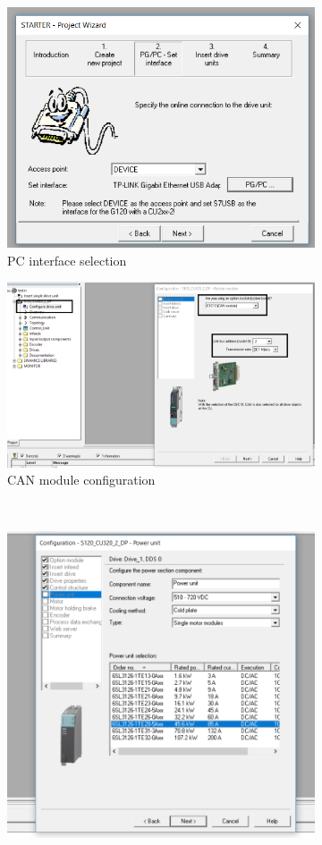 \begin{figure}
	\centering
	\begin{subfigure}{0.45\linewidth}
		\centering
		\includegraphics[width=0.7\linewidth]{figures/starter_01}
		\caption{PC interface selection}
	\end{subfigure}
	\begin{subfigure}{0.45\linewidth}
		\centering
		\includegraphics[width=0.9\linewidth]{figures/starter_02}
		\caption{CAN module configuration}
	\end{subfigure}
	\\
	\vspace{1cm}
	\begin{subfigure}{0.32\linewidth}
		\centering
		\includegraphics[width=0.9\linewidth]{figures/starter_03}

\end{subfigure}
\end{figure}
